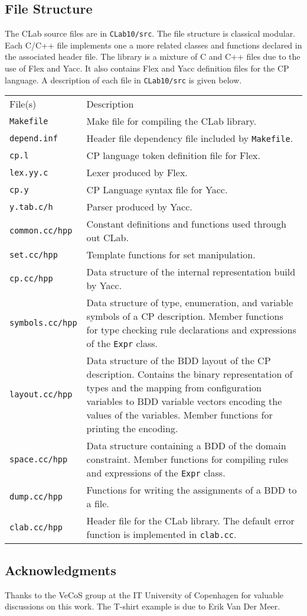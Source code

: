 \documentclass{article}
\begin{document}
\subsection{File Structure}
The CLab source files are in \texttt{CLab10/src}. The file structure
is classical modular. Each C/C++ file implements one a more related
classes and functions declared in the associated header file. The
library is a mixture of C and C++ files due to the use of Flex and
Yacc. It also contains Flex and Yacc definition files for the CP
language. A description of each file in \texttt{CLab10/src} is given
below.
\begin{center}
\begin{tabular}{lp{11.0cm}} 
File(s)                 & Description \\
\texttt{Makefile}       & Make file for compiling the CLab library.\\
\texttt{depend.inf}     & Header file dependency file included by \texttt{Makefile}. \\
\texttt{cp.l}           & CP language token definition file for Flex. \\
\texttt{lex.yy.c}       & Lexer produced by Flex. \\
\texttt{cp.y}           & CP Language syntax file for Yacc. \\
\texttt{y.tab.c/h}      & Parser produced by Yacc. \\
\texttt{common.cc/hpp}  & Constant definitions and functions used through out CLab. \\
\texttt{set.cc/hpp}     & Template functions for set manipulation. \\
\texttt{cp.cc/hpp}      & Data structure of the internal representation build by Yacc. \\
\texttt{symbols.cc/hpp} & Data structure of type, enumeration, and variable symbols
                          of a CP description. Member functions for type checking 
                          rule declarations and expressions of the \texttt{Expr} class. \\
\texttt{layout.cc/hpp}  & Data structure of the BDD layout of the CP description. Contains the 
                          binary representation of types and the mapping from configuration
                          variables to BDD variable vectors encoding the values of the variables.
                          Member functions for printing the encoding.\\
\texttt{space.cc/hpp}   & Data structure containing a BDD of the domain constraint. Member 
                          functions for compiling rules and expressions of the \texttt{Expr}
                          class.  \\
\texttt{dump.cc/hpp}    & Functions for writing the assignments of a BDD to a file. \\
\texttt{clab.cc/hpp}    & Header file for the CLab library. The default error function is
                          implemented in \texttt{clab.cc}.
\end{tabular}
\end{center}



\subsection*{Acknowledgments}
Thanks to the VeCoS group at the IT University of Copenhagen for
valuable discussions on this work. The T-shirt example is due to Erik
Van Der Meer.




\end{document}
